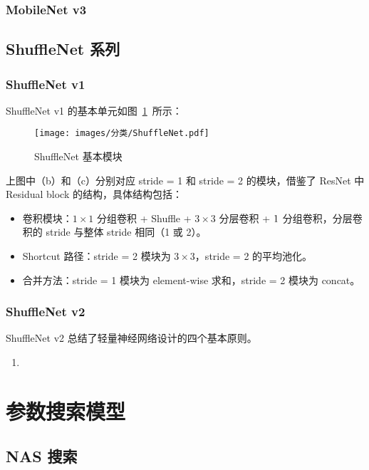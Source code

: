 \subsection{MobileNet v3}

\section{ShuffleNet 系列}
\subsection{ShuffleNet v1}
ShuffleNet v1 的基本单元如图~\ref{fig:shufflenet}~所示：

\begin{figure}[ht]
  \centering
  \texttt{[image: images/分类/ShuffleNet.pdf]}
  \caption{ShuffleNet 基本模块}\label{fig:shufflenet}
\end{figure}

上图中（b）和（c）分别对应 stride = 1 和 stride = 2 的模块，借鉴了 ResNet 中
Residual block 的结构，具体结构包括：

\begin{itemize}
  \item 卷积模块：$1 \times 1$ 分组卷积 + Shuffle + $3 \times 3$ 分层卷积 + $1
    \time 1$ 分组卷积，分层卷积的 stride 与整体 stride 相同（1 或 2）。
  \item Shortcut 路径：stride = 2 模块为 $3 \times 3$，stride = 2 的平均池化。
  \item 合并方法：stride = 1 模块为 element-wise 求和，stride = 2 模块为 concat。
\end{itemize}

\subsection{ShuffleNet v2}
ShuffleNet v2 总结了轻量神经网络设计的四个基本原则。

\begin{enumerate}
  \item 
\end{enumerate}

\chapter{参数搜索模型}

\section{NAS 搜索}

